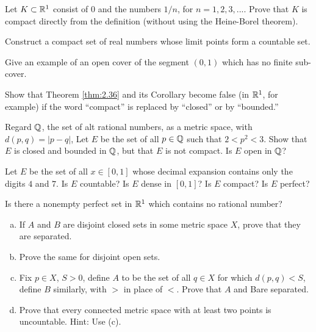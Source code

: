 \begin{myExercise}
    \label{ex:2.12}
    Let $K \subset {\protect\mathbb R}^1$ consist of $0$ and the numbers $1/n$, 
    for $n = 1, 2, 3, ...$. 
    Prove that $K$ is compact directly from the definition 
    (without using the Heine-Borel theorem).
\end{myExercise}

\begin{myExercise}
    \label{ex:2.13}
    Construct a compact set of real numbers whose limit points form a countable set.
\end{myExercise}

\begin{myExercise}
    \label{ex:2.14}
    Give an example of an open cover of the segment $(0, 1)$ 
    which has no finite sub-cover.
\end{myExercise}

\begin{myExercise}
    \label{ex:2.15}
    Show that Theorem \ref{thm:2.36} and its Corollary become false 
    (in ${\protect\mathbb R}^1$, for example) 
    if the word ``compact'' is replaced by ``closed'' or by ``bounded.''
\end{myExercise}

\begin{myExercise}
    \label{ex:2.16}
    Regard ${\protect\mathbb Q}$, the set of alt rational numbers, as a metric space, 
    with $d(p, q) = |p - q|$,
    Let $E$ be the set of all $p \in {\protect\mathbb Q}$ such that $2 < p^2 < 3$. 
    Show that $E$ is closed and bounded in ${\protect\mathbb Q}$, 
    but that $E$ is not compact. 
    Is $E$ open in ${\protect\mathbb Q}$?
\end{myExercise}

\begin{myExercise}
    \label{ex:2.17}
    Let $E$ be the set of all $x \in [0, 1]$ 
    whose decimal expansion contains only the digits $4$ and $7$. 
    Is $E$ countable? 
    Is $E$ dense in $[0, 1]$? 
    Is $E$ compact? 
    Is $E$ perfect?
\end{myExercise}

\begin{myExercise}
    \label{ex:2.18}
    Is there a nonempty perfect set in ${\protect\mathbb R}^1$ which contains no rational number?
\end{myExercise}


\begin{myExercise}
    \label{ex:2.19}
    \begin{enumerate}[(a)]
        \item If $A$ and $B$ are disjoint closed sets in some metric space $X$, prove that they are separated.
        \item Prove the same for disjoint open sets. 
        \item Fix $p \in X$, $S > 0$, define $A$ to be the set of all $q \in X$ for which $d(p, q) < S$, define $B$ similarly, with $>$ in place of $<$. Prove that $A$ and Bare separated.
        \item Prove that every connected metric space with at least two points is uncountable. Hint: Use (c).
    \end{enumerate}
\end{myExercise}

